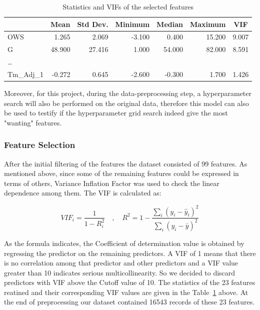 \documentclass{article}
\begin{document}
\begin{table}[H]
\caption{Statistics and VIFs of the selected features}
  \label{table:Statistics and VIFs}
  \centering
\begin{tabular}{@{}lrrrrrr@{}}
\toprule
                & \multicolumn{1}{c}{Mean} & \multicolumn{1}{c}{Std Dev.} & \multicolumn{1}{c}{Minimum} & \multicolumn{1}{c}{Median} & \multicolumn{1}{c}{Maximum} & \multicolumn{1}{c}{VIF} \\ \midrule
OWS             & 1.265                    & 2.069                        & -3.100                      & 0.400                      & 15.200                      & 9.007                   \\
G               & 48.900                   & 27.416                       & 1.000                       & 54.000                     & 82.000                      & 8.591                   \\
\ldots & & & & & & \\
Tm\_Adj\_1      & -0.272                   & 0.645                        & -2.600                      & -0.300                     & 1.700                       & 1.426                   \\ 
\bottomrule
\end{tabular}
\end{table}

Moreover, for this project, during the data-preprocessing step, a hyperparameter search will also be performed on the original data, therefore this model can also be used to testify if the hyperparameter grid search indeed give the most "wanting" features.

\subsubsection{Feature Selection}
After the initial filtering of the features the dataset consisted of 99 features. As mentioned above, since some of the remaining features could be expressed in terms of others, Variance Inflation Factor was used to check the linear dependence among them. The VIF is calculated as:

$$
VIF_i = \frac{1}{1-R_i^2} \quad , \quad R^2 = 1 - \frac{\sum_i (y_i-\hat{y}_i)^2}{\sum_i (y_i-\bar{y})^2}
$$

As the formula indicates, the Coefficient of determination value is obtained by regressing the predictor on the remaining predictors. A VIF of 1 means that there is no correlation among that predictor and other predictors and a VIF value greater than 10 indicates serious multicollinearity. So we decided to discard predictors with VIF above the Cutoff value of 10. The statistics of the 23 features reatined and their corresponding VIF values are given in the Table~\ref{table:Statistics and VIFs} above. At the end of preprocessing our dataset contained 16543 records of these 23 features.
\end{document}
